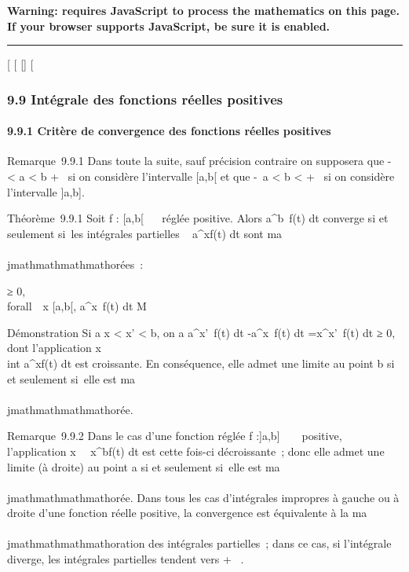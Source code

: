 \textbf{Warning: 
requires JavaScript to process the mathematics on this page.\\ If your
browser supports JavaScript, be sure it is enabled.}

\begin{center}\rule{3in}{0.4pt}\end{center}

{[}
{[}
{[}{]}
{[}

\subsubsection{9.9 Intégrale des fonctions réelles positives}

\paragraph{9.9.1 Critère de convergence des fonctions réelles positives}

Remarque~9.9.1 Dans toute la suite, sauf précision contraire on
supposera que -\infty~ \textless{} a \textless{} b \leq +\infty~ si on considère
l'intervalle {[}a,b{[} et que -\infty~\leq a \textless{} b \textless{} +\infty~ si on
considère l'intervalle {]}a,b{]}.

Théorème~9.9.1 Soit f : {[}a,b{[}\rightarrow~ ~ réglée positive. Alors
\int  a^b~f(t) dt converge si et
seulement si~les intégrales partielles \int ~
a^xf(t) dt sont ma\\\\jmathmathmathmathorées~:

\existsM ≥ 0, \\forall~~x \in
{[}a,b{[}, \int  a^x~f(t) dt \leq M

Démonstration Si a \leq x \textless{} x' \textless{} b, on a
\int  a^x'~f(t) dt
-\int  a^x~f(t) dt
=\int  x^x'~f(t) dt ≥ 0, dont
l'application x\mapsto~\\int
 a^xf(t) dt est croissante. En conséquence, elle admet
une limite au point b si et seulement si~elle est ma\\\\jmathmathmathmathorée.

Remarque~9.9.2 Dans le cas d'une fonction réglée f :{]}a,b{]} \rightarrow~ ~
positive, l'application
x\mapsto~\int ~
x^bf(t) dt est cette fois-ci décroissante~; donc elle
admet une limite (à droite) au point a si et seulement si~elle est
ma\\\\jmathmathmathmathorée. Dans tous les cas d'intégrales impropres à gauche ou à droite
d'une fonction réelle positive, la convergence est équivalente à la
ma\\\\jmathmathmathmathoration des intégrales partielles~; dans ce cas, si l'intégrale
diverge, les intégrales partielles tendent vers + \infty~.

